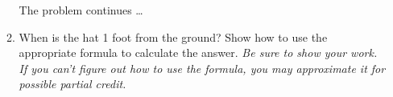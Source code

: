 \documentclass[12pt]{article}
\begin{document}
\begin{enumerate}
\begin{enumerate}
\newpage

\hspace{-.5in}  The problem continues \dots

\item When is the hat 1 foot from the ground?  Show how to use the appropriate formula to calculate the answer.  \emph{Be sure to show your work.  If you can't figure out how to use the formula, you may approximate it for possible partial credit.}
\vfill
\vfill
\end{enumerate}







\end{enumerate}
\end{document}
